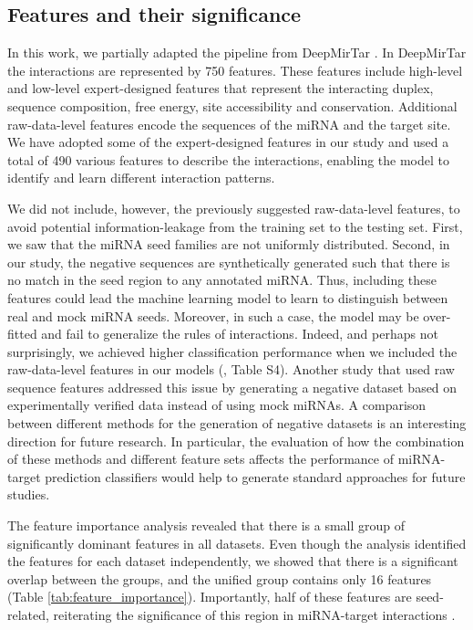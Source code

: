 \documentclass{bmcart}
\begin{document}
\subsection*{Features and their significance}
In this work, we partially adapted the pipeline from DeepMirTar \cite{wen2018deepmirtar}. In DeepMirTar the interactions are represented by 750 features. These features include high-level and low-level expert-designed features that represent the interacting duplex, sequence composition, free energy, site accessibility and conservation. Additional raw-data-level features encode the sequences of the miRNA and the target site. We have adopted some of the expert-designed features in our study and used a total of 490 various features to describe the interactions, enabling the model to identify and learn different interaction patterns. 

We did not include, however, the previously suggested raw-data-level features, to avoid potential information-leakage from the training set to the testing set. First, we saw that the miRNA seed families are not uniformly distributed. Second, in our study, the negative sequences are synthetically generated such that there is no match in the seed region to any annotated miRNA. Thus, including these features could lead the machine learning model to learn to distinguish between real and mock miRNA seeds.  Moreover, in such a case, the model may be over-fitted and fail to generalize the rules of interactions. Indeed, and perhaps not surprisingly, we achieved higher classification performance when we included the raw-data-level features in our models (, Table S4). Another study \cite{pla2018miraw} that used raw sequence features addressed this issue by generating a negative dataset based on experimentally verified data instead of using mock miRNAs. A comparison between different methods for the generation of negative datasets is an interesting direction for future research. In particular, the evaluation of how the combination of these methods and different feature sets affects the performance of miRNA-target prediction classifiers would help to generate standard approaches for future studies.

The feature importance analysis revealed that there is a small group of significantly dominant features in all datasets. Even though the analysis identified the features for each dataset independently, we showed that there is a significant overlap between the groups, and the unified group contains only 16 features (Table \ref{tab:feature_importance}). Importantly, half of these features are seed-related, reiterating the significance of this region in miRNA-target interactions \cite{agarwal2015predicting}.
\end{document}
